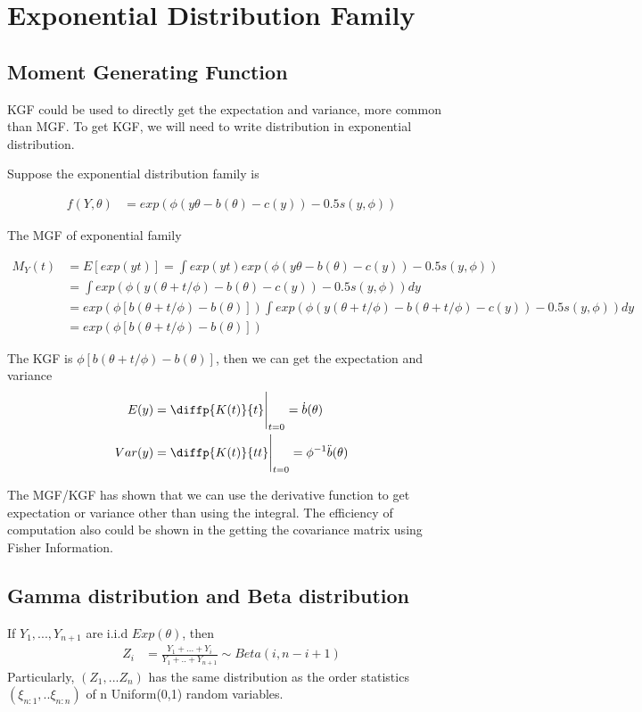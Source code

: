 
 \section{Exponential Distribution Family}


\subsection{Moment Generating Function}

KGF could be used to directly get the expectation and variance, more common than MGF. To get KGF, we will need to write distribution in exponential distribution.

Suppose the exponential distribution family is 

\begin{align*}
	f(Y, \theta) &= exp\left( \phi (y \theta - b(\theta) -c(y)) - 0.5s(y, \phi) \right)
\end{align*}

The MGF of exponential family

\begin{align*}
	M_Y(t) &= E[ exp(yt)] = \int exp(yt) exp\left( \phi (y \theta - b(\theta) -c(y)) - 0.5s(y, \phi) \right) \\
	&= \int  exp \left( \phi (y (\theta + t/\phi) - b(\theta) -c(y)) - 0.5s(y, \phi) \right) dy\\
	&= exp(\phi [b(\theta + t/\phi) - b(\theta)]) \int  exp\left( \phi (y (\theta + t/\phi) - b(\theta + t/\phi) -c(y)) - 0.5s(y, \phi) \right) dy\\
	&= exp(\phi [b(\theta + t/\phi) - b(\theta)]) 
\end{align*}

The KGF is $\phi [b(\theta + t/\phi) - b(\theta)]$, then we can get the expectation and variance
\begin{align*}
	E(y) &= \diffp{K(t)}{t} \Bigg |_{t=0} = \dot{b}(\theta)\\
	Var(y) &= \diffp{K(t)}{t t} \Bigg |_{t=0} = \phi^{-1} \ddot{b}(\theta)
\end{align*}

The MGF/KGF has shown that we can use the derivative function to get expectation or variance other than using the integral. The efficiency of computation also could be shown in the getting the covariance matrix using Fisher Information.


 
\subsection{Gamma distribution and Beta distribution}
If $Y_1, ..., Y_{n+1}$ are i.i.d $Exp(\theta)$, then 
\begin{align*}
	Z_i &= \frac{Y_1 + ...+ Y_i}{Y_1+ .. + Y_{n+1}} \sim Beta(i, n-i+1) 
\end{align*}
Particularly, $(Z_1, ... Z_n)$ has the same distribution as the order statistics $(\xi_{n:1}, .. \xi_{n:n})$ of n Uniform(0,1) random variables.


